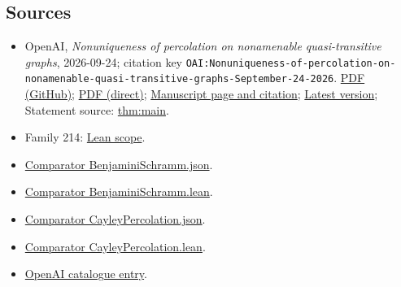 \documentclass[11pt]{article}
\begin{document}
\subsection{Sources}
\begin{itemize}
\item OpenAI, \emph{Nonuniqueness of percolation on nonamenable quasi-transitive graphs}, 2026-09-24; citation key \texttt{OAI:Nonuniqueness-of-percolation-on-nonamenable-quasi-transitive-graphs-September-24-2026}. \href{https://github.com/openai/math/blob/adc7f1241b42e322a6451854ab7e4b4c146bf78a/preprints/Nonuniqueness-of-percolation-on-nonamenable-quasi-transitive-graphs-September-24-2026/paper.pdf}{PDF (GitHub)}; \href{https://github.com/openai/math/raw/adc7f1241b42e322a6451854ab7e4b4c146bf78a/preprints/Nonuniqueness-of-percolation-on-nonamenable-quasi-transitive-graphs-September-24-2026/paper.pdf}{PDF (direct)}; \href{https://github.com/openai/math/blob/adc7f1241b42e322a6451854ab7e4b4c146bf78a/preprints/Nonuniqueness-of-percolation-on-nonamenable-quasi-transitive-graphs-September-24-2026/README.md}{Manuscript page and citation}; \href{https://github.com/openai/math/blob/main/preprints/Nonuniqueness-of-percolation-on-nonamenable-quasi-transitive-graphs-September-24-2026/paper.pdf}{Latest version}; Statement source: \href{https://github.com/openai/math/blob/adc7f1241b42e322a6451854ab7e4b4c146bf78a/preprints/Nonuniqueness-of-percolation-on-nonamenable-quasi-transitive-graphs-September-24-2026/build/sections/introduction.tex\#L58}{thm:main}.
\item Family 214: \href{https://github.com/openai/math/blob/adc7f1241b42e322a6451854ab7e4b4c146bf78a/lean/docs/214.md}{Lean scope}.
\item \href{https://github.com/openai/math/blob/adc7f1241b42e322a6451854ab7e4b4c146bf78a/lean/ComparatorChallenges/BenjaminiSchramm.json}{Comparator BenjaminiSchramm.json}.
\item \href{https://github.com/openai/math/blob/adc7f1241b42e322a6451854ab7e4b4c146bf78a/lean/ComparatorChallenges/BenjaminiSchramm.lean}{Comparator BenjaminiSchramm.lean}.
\item \href{https://github.com/openai/math/blob/adc7f1241b42e322a6451854ab7e4b4c146bf78a/lean/ComparatorChallenges/CayleyPercolation.json}{Comparator CayleyPercolation.json}.
\item \href{https://github.com/openai/math/blob/adc7f1241b42e322a6451854ab7e4b4c146bf78a/lean/ComparatorChallenges/CayleyPercolation.lean}{Comparator CayleyPercolation.lean}.
\item \href{https://github.com/openai/math/blob/adc7f1241b42e322a6451854ab7e4b4c146bf78a/CONTENTS.md}{OpenAI catalogue entry}.
\end{itemize}
\end{document}
